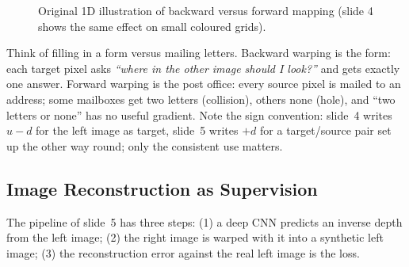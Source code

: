 \documentclass[11pt,a4paper]{article}
\theoremstyle{definition}
\theoremstyle{plain}
\theoremstyle{remark}
\begin{document}
\begin{figure}[H]
\centering
{}
\caption{Original 1D illustration of backward versus forward mapping (slide 4 shows the same effect on small coloured grids).}
\end{figure}

\begin{intuition}
Think of filling in a form versus mailing letters. Backward warping is the form: each target pixel asks \emph{``where in the other image should I look?''} and gets exactly one answer. Forward warping is the post office: every source pixel is mailed to an address; some mailboxes get two letters (collision), others none (hole), and ``two letters or none'' has no useful gradient. Note the sign convention: slide~4 writes $u-d$ for the left image as target, slide~5 writes $+d$ for a target/source pair set up the other way round; only the consistent use matters.
\end{intuition}

\subsection{Image Reconstruction as Supervision }
The pipeline of slide~5 has three steps: (1) a deep CNN predicts an inverse depth from the left image; (2) the right image is warped with it into a synthetic left image; (3) the reconstruction error against the real left image is the loss.
\end{document}
